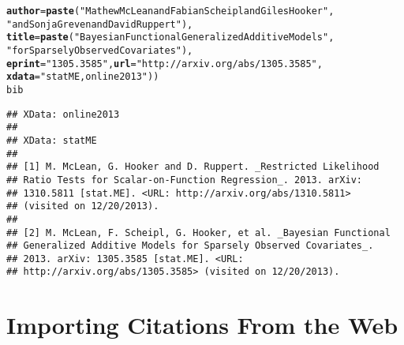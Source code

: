 \documentclass[article]{jss}\usepackage[]{graphicx}\usepackage[]{color}
\makeatletter
\newcommand{\hlstr}[1]{\textcolor[rgb]{0.125,0.125,1}{#1}}%
\newcommand{\hlstd}[1]{\textcolor[rgb]{0.251,0.251,0.282}{#1}}%
\newcommand{\hlkwc}[1]{\textcolor[rgb]{0.529,0,0.184}{\textbf{#1}}}%
\newcommand{\hlkwd}[1]{\textcolor[rgb]{0.251,0.251,0.282}{\textbf{#1}}}%
\newenvironment{kframe}{%
 \def\at@end@of@kframe{}%
 \ifinner\ifhmode%
  \def\at@end@of@kframe{\end{minipage}}%
  \begin{minipage}{\columnwidth}%
 \fi\fi%
 \def\FrameCommand##1{\hskip\@totalleftmargin \hskip-\fboxsep
 \colorbox{shadecolor}{##1}\hskip-\fboxsep
     \hskip-\linewidth \hskip-\@totalleftmargin \hskip\columnwidth}%
 \MakeFramed {\advance\hsize-\width
   \@totalleftmargin\z@ \linewidth\hsize
   \@setminipage}}%
 {\par\unskip\endMakeFramed%
 \at@end@of@kframe}
\newenvironment{knitrout}{}{} %
\makeatother
\begin{document}
\begin{knitrout}
\begin{kframe}
\begin{alltt}
  \hlkwc{author} \hlstd{=} \hlkwd{paste}\hlstd{(}\hlstr{"Mathew McLean and Fabian Scheipl and Giles Hooker"}\hlstd{,}
                \hlstr{"and Sonja Greven and David Ruppert"}\hlstd{),}
  \hlkwc{title} \hlstd{=} \hlkwd{paste}\hlstd{(}\hlstr{"Bayesian Functional Generalized Additive Models"}\hlstd{,}
               \hlstr{"for Sparsely Observed Covariates"}\hlstd{),}
  \hlkwc{eprint} \hlstd{=} \hlstr{"1305.3585"}\hlstd{,} \hlkwc{url} \hlstd{=} \hlstr{"http://arxiv.org/abs/1305.3585"}\hlstd{,}
  \hlkwc{xdata} \hlstd{=} \hlstr{"statME,online2013"}\hlstd{))}
\hlstd{bib}
\end{alltt}
\begin{verbatim}
## XData: online2013
## 
## XData: statME
## 
## [1] M. McLean, G. Hooker and D. Ruppert. _Restricted Likelihood
## Ratio Tests for Scalar-on-Function Regression_. 2013. arXiv:
## 1310.5811 [stat.ME]. <URL: http://arxiv.org/abs/1310.5811>
## (visited on 12/20/2013).
## 
## [2] M. McLean, F. Scheipl, G. Hooker, et al. _Bayesian Functional
## Generalized Additive Models for Sparsely Observed Covariates_.
## 2013. arXiv: 1305.3585 [stat.ME]. <URL:
## http://arxiv.org/abs/1305.3585> (visited on 12/20/2013).
\end{verbatim}
\end{kframe}
\end{knitrout}

\section{Importing Citations From the Web}
\end{document}
